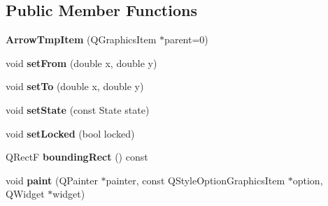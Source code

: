 \subsection*{Public Member Functions}
\begin{DoxyCompactItemize}
\item 
\hypertarget{class_arrow_tmp_item_a1cd82543a207255d2cdef8c198236d06}{{\bfseries Arrow\-Tmp\-Item} (Q\-Graphics\-Item $\ast$parent=0)}\label{class_arrow_tmp_item_a1cd82543a207255d2cdef8c198236d06}

\item 
\hypertarget{class_arrow_tmp_item_aee12d2b592d1c57755a05a906c72dcc5}{void {\bfseries set\-From} (double x, double y)}\label{class_arrow_tmp_item_aee12d2b592d1c57755a05a906c72dcc5}

\item 
\hypertarget{class_arrow_tmp_item_a0bb27a1afbc3f8a01e8c0c873d355e77}{void {\bfseries set\-To} (double x, double y)}\label{class_arrow_tmp_item_a0bb27a1afbc3f8a01e8c0c873d355e77}

\item 
\hypertarget{class_arrow_tmp_item_a0dd940fe1ecbcf51b575fef8fa015c7d}{void {\bfseries set\-State} (const State state)}\label{class_arrow_tmp_item_a0dd940fe1ecbcf51b575fef8fa015c7d}

\item 
\hypertarget{class_arrow_tmp_item_af18ae501219595c75ec0559215d49956}{void {\bfseries set\-Locked} (bool locked)}\label{class_arrow_tmp_item_af18ae501219595c75ec0559215d49956}

\item 
\hypertarget{class_arrow_tmp_item_a51fc370cee320dbe80af6ad9ae33dafc}{Q\-Rect\-F {\bfseries bounding\-Rect} () const }\label{class_arrow_tmp_item_a51fc370cee320dbe80af6ad9ae33dafc}

\item 
\hypertarget{class_arrow_tmp_item_a6f05cbbcb2ed2934b214fbdf22261f72}{void {\bfseries paint} (Q\-Painter $\ast$painter, const Q\-Style\-Option\-Graphics\-Item $\ast$option, Q\-Widget $\ast$widget)}\label{class_arrow_tmp_item_a6f05cbbcb2ed2934b214fbdf22261f72}

\end{DoxyCompactItemize}
